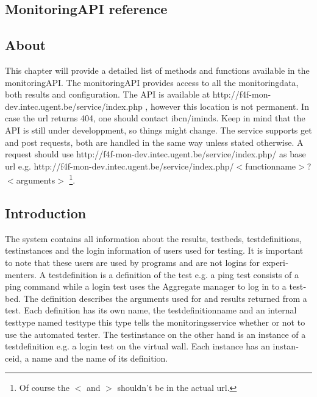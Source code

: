 \begin{otherlanguage}{english}
\chapter{MonitoringAPI reference}
\section{About}
This chapter will provide a detailed list of methods and functions available in the monitoringAPI. The monitoringAPI provides access to all the monitoringdata, both results and configuration. The API is available at http://f4f-mon-dev.intec.ugent.be/service/index.php , however this location is not permanent. In case the url returns 404, one should contact ibcn/iminds. Keep in mind that the API is still under developpment, so things might change.
\npar
The service supports get and post requests, both are handled in the same way unless stated otherwise. A request should use http://f4f-mon-dev.intec.ugent.be/service/index.php/ as base url e.g. http://f4f-mon-dev.intec.ugent.be/service/index.php/$<$functionname$>$?$<$arguments$>$ \footnote{Of course the $<$ and $>$ shouldn't be in the actual url.}. 

\section{Introduction}
The system contains all information about the results, testbeds, testdefinitions, testinstances and the login information of users used for testing. It is important to note that these users are used by programs and are not logins for experimenters.  
\npar
A testdefinition is a definition of the test e.g. a ping test consists of a ping command while a login test uses the Aggregate manager to log in to a testbed. The definition describes the arguments used for and results returned from a test. Each definition has its own name, the testdefinitionname and an internal testtype named testtype this type tells the monitoringsservice whether or not to use the automated tester.
\npar
The testinstance on the other hand is an instance of a testdefinition e.g. a login test on the virtual wall. Each instance has an instanceid, a name and the name of its definition.


\end{otherlanguage}
